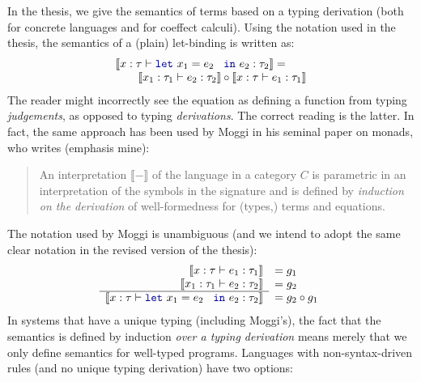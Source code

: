 \documentclass[
		twoside,openright,titlepage,numbers=noenddot,headinclude,%
                footinclude=true,cleardoublepage=empty,
                BCOR=10mm,paper=a4,fontsize=10pt, %
                ngerman,american, %
                ]{scrreprt}
\newcommand{\kvd}[1]{\textnormal{\textcolor{kvdclr}{\ttfamily #1}}}
\newcommand{\sem}[1]{\llbracket #1 \rrbracket}
\begin{document}
In the thesis, we give the semantics of terms based on a typing derivation (both for concrete
languages and for coeffect calculi). Using the notation used in the thesis, the semantics of
a (plain) let-binding is written as:
%
\begin{equation*}
\begin{array}{l}
 \sem{x:\tau \vdash \kvd{let}~x_1=e_2~\kvd{in}~e_2 : \tau_2} = \\ \qquad
 \sem{x_1:\tau_1 \vdash e_2 : \tau_2} \circ
 \sem{x:\tau \vdash e_1 : \tau_1}
\end{array}
\end{equation*}
%
The reader might incorrectly see the equation as defining a function from typing \emph{judgements},
as opposed to typing \emph{derivations}. The correct reading is the latter. In fact,
the same approach has been used by Moggi in his seminal paper on monads, who writes
\cite[p7]{monad-notions} (emphasis mine):

\vspace{-0.5em}
\begin{quotation}
\noindent
An interpretation $\sem{-}$ of the language in a category $C$ is parametric in an interpretation
of the symbols in the signature and is defined by \emph{induction on the derivation} of
well-formedness for (types,) terms and equations.
\end{quotation}
\vspace{-0.5em}

\noindent
The notation used by Moggi is unambiguous (and we intend to adopt the same clear notation in the
revised version of the thesis):
%
\begin{equation*}
  \begin{array}{r}
    \sem{x:\tau \vdash e_1 : \tau_1} \\
    \sem{x_1:\tau_1 \vdash e_2 : \tau_2} \\ \hline
    \sem{x:\tau \vdash \kvd{let}~x_1=e_2~\kvd{in}~e_2 : \tau_2}
  \end{array}
  \begin{array}{l}
    = g_1 \\
    = g_2 \\
    = g_2 \circ g_1
  \end{array}
\end{equation*}
%
In systems that have a unique typing (including Moggi's), the fact that
the semantics is defined by induction \emph{over a typing derivation} means merely that we only
define semantics for well-typed programs. Languages with non-syntax-driven rules
(and no unique typing derivation) have two options:
\end{document}
